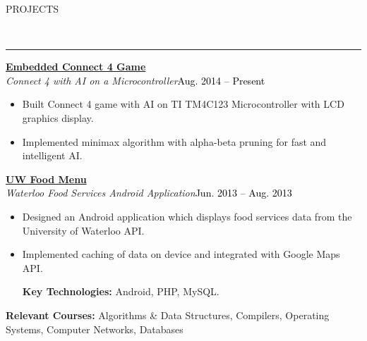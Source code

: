 \documentclass[11pt, letterpaper, oneside]{article}
\newcommand{\HRule}[2]{\textcolor{#1}{\rule{\linewidth}{#2}}}
\newcommand{\sectiontitle}[1]{\begin{minipage}{\textwidth}\vspace{-7.5pt}\begin{flushleft}\hspace{-20.5pt}\vspace{-25pt}
\Large\MakeUppercase{#1}\end{flushleft}\end{minipage}\\\HRule{black}{0.15mm}\vspace{\baselineskip}}
\newenvironment{ressection}[1]{
  \sectiontitle{#1}}
  {\vspace{-\baselineskip}}
\newcommand{\resentryheader}[4]{
    \vspace{-6pt}
    \textbf{#1}\hspace{\stretch{1}}\textcolor{black}{#3}\\
    \textit{#2}\hspace{\stretch{1}}\textcolor{black}{#4}\\
}
\newcommand{\resitem}[1]{
    \vspace{2pt}
    \item \begin{flushleft} #1 \end{flushleft}
}
\newenvironment{resentry}[4]{
  \begin{minipage}{\textwidth}
  \vspace{-3pt}
    \resentryheader{#1}{#2}{#3}{#4}
        \vspace{-\baselineskip}
    \begin{itemize}[noitemsep,nolistsep]
}{
    \end{itemize}
        \vspace{\baselineskip}
        \end{minipage}
}
\begin{document}
\begin{ressection}{Projects}
  \begin{resentry}{\href{https://github.com/coreywu/Connect4}{Embedded Connect 4 Game}}{Connect 4 with AI on a Microcontroller}{}{Aug. 2014 -- Present}
    \resitem{Built Connect 4 game with AI on TI TM4C123 Microcontroller with LCD graphics display.}
    \resitem{Implemented minimax algorithm with alpha-beta pruning for fast and intelligent AI.}
    \hspace{-15pt}
  \end{resentry}
  \begin{resentry}{\href{https://play.google.com/store/apps/details?id=ca.uwaterloo.uwfoodservices&hl=en}{UW Food Menu}}{Waterloo Food Services Android Application}{}{Jun. 2013 -- Aug. 2013}
    \resitem{Designed an Android application which displays food services data from the University of Waterloo API.}
    \resitem{Implemented caching of data on device and integrated with Google Maps API.}
    \vspace{2pt} \hspace{-15pt}
    \textbf{Key Technologies:} Android, PHP, MySQL.
	\vspace{2pt}  
  \end{resentry}
  \textbf{Relevant Courses:} Algorithms \& Data Structures, Compilers, Operating Systems, Computer Networks, Databases
\end{ressection}
\end{document}
